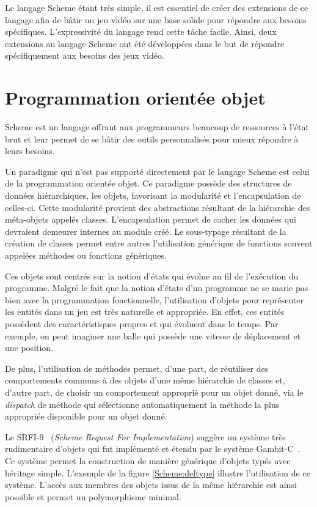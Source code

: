 \documentclass[12pt,twoside,letterpaper,francais]{book}
\begin{document}
Le langage Scheme étant très simple, il est essentiel de créer des
extensions de ce langage afin de bâtir un jeu vidéo sur une base
solide pour répondre aux besoins spécifiques. L'expressivité du
langage rend cette tâche facile. Ainsi, deux extensions au langage
Scheme ont été développées dans le but de répondre spécifiquement aux
besoins des jeux vidéo.

\clearpage

\chapter{Programmation orientée objet}\label{Chap:OO}
Scheme est un langage offrant aux programmeurs beaucoup de ressources
à l'état brut et leur permet de se bâtir des outils personnalisés pour
mieux répondre à leurs besoins.

Un paradigme qui n'est pas supporté directement par le langage Scheme
est celui de la programmation orientée objet. Ce paradigme possède des
structures de données hiérarchiques, les objets, favorisant la
modularité et l'encapsulation de celles-ci. Cette modularité provient
des abstractions résultant de la hiérarchie des méta-objets appelés
classes. L'encapsulation permet de cacher les données qui devraient
demeurer internes au module créé.  Le sous-typage résultant de la
création de classes permet entre autres l'utilisation générique de
fonctions souvent appelées méthodes ou fonctions génériques.

Ces objets sont centrés sur la notion d'états qui évolue au fil de
l'exécution du programme. Malgré le fait que la notion d'états d'un
programme ne se marie pas bien avec la programmation fonctionnelle,
l'utilisation d'objets pour représenter les entités dans un jeu est
très naturelle et appropriée. En effet, ces entités possèdent des
caractéristiques propres et qui évoluent dans le temps. Par exemple,
on peut imaginer une balle qui possède une vitesse de déplacement et
une position.

De plus, l'utilisation de méthodes permet, d'une part, de réutiliser
des comportements communs à des objets d'une même hiérarchie de
classes et, d'autre part, de choisir un comportement approprié pour un
objet donné, via le \textit{dispatch} de méthode qui sélectionne
automatiquement la méthode la plus appropriée disponible pour un objet
donné.

Le SRFI-9~\cite{SRFI_9} (\textit{Scheme Request For Implementation})
suggère un système très rudimentaire d'objets qui fut implémenté et
étendu par le système Gambit-C~\cite{Gambit4}. Ce système permet la
construction de manière générique d'objets typés avec héritage
simple. L'exemple de la figure \ref{Scheme:deftype} illustre
l'utilisation de ce système. L'accès aux membres des objets issus de
la même hiérarchie est ainsi possible et permet un polymorphisme
minimal.
\end{document}

